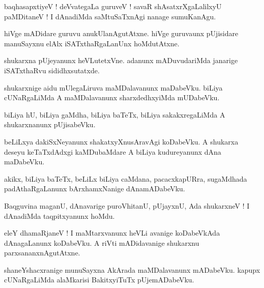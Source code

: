 \documentclass{article}
\begin{document}
\begin{mng}%
baqhasapxtiyeV ! deVvategaLa guruveV ! savaR shAsatxrXgaLalilxyU paMDitaneV ! I dAnadiMda 
saMtuSaTxnAgi nanage sumuKanAgu.
\end{mng}

\begin{mng}%
hiVge mADidare guruvu anukUlanAgutAtxne. hiVge guruvaunx pUjisidare manuSayxnu elAlx 
iSATxthaRgaLanUnx hoMdutAtxne.
\end{mng}

\begin{mng}%
shukarxna pUjeyanunx heVLutetxVne. adanunx mADuvudariMda janarige iSATxthaRvu sididhxsutatxde.
\end{mng}

\begin{mng}%
shukarxnige aidu mUlegaLiruva maMDalavanunx maDabeVku. biLiya cUNaRgaLiMda A maMDalavanunx 
sharxdedhxyiMda mUDabeVku.
\end{mng}

\begin{mng}%
biLiya hU, biLiya gaMdha, biLiya baTeTx, biLiya sakakxregaLiMda A shukarxnanunx pUjisabeVku.
\end{mng}

\begin{mng}%
beLiLxya dakiSxNeyanunx shakatxyXnusAravAgi koDabeVku. A shukarxa deseyu keTaTxdAdxgi kaMDubaMdare 
A biLiya kudureyanunx dAna maDabeVku.
\end{mng}

\begin{mng}%
akikx, biLiya baTeTx, beLiLx biLiya caMdana, pacacxkapURra, sugaMdhada padAthaRgaLanunx 
bArxhamxNanige dAnamADabeVku.
\end{mng}

\begin{mng}%
Baqguvina maganU, dAnavarige puroVhitanU, pUjayxnU, Ada shukarxneV ! I dAnadiMda taqpitxyanunx hoMdu.
\end{mng}

\begin{mng}%
eleY dhamaRjaneV ! I maMtarxvanunx heVLi avanige koDabeVkAda dAnagaLanunx koDabeVku. A riVti 
mADidavanige shukarxnu parxsananxnAgutAtxne.
\end{mng}

\begin{mng}%
shaneYshacxranige munuSayxna AkArada maMDalavanunx mADabeVku. kapupx cUNaRgaLiMda alaMkarisi 
BakitxyiTuTx pUjemADabeVku.
\end{mng}
\end{document}
